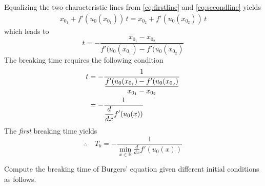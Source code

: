 \documentclass[12pt]{article}
\begin{document}
Equalizing the two characteristic lines from \eqref{eq:firstline} and \eqref{eq:secondline} yields
\begin{align}
	x_{0_{1}} + f'(u_{0}(x_{0_{1}}))\,t = x_{0_{2}} + f'(u_{0}(x_{0_{2}}))\,t  
\end{align}
which leads to
\begin{equation}
	t=-\frac{x_{0_{1}} - x_{0_{2}}}{f'(u_{0}(x_{0_{1}})-f'(u_{0}(x_{0_{2}})}
\end{equation}
The breaking time requires the following condition
\begin{align}
	t & =-\frac{1}{\displaystyle \frac{f'(u_{0}(x_{0_{1}})-f'(u_{0}(x_{0_{2}})}{x_{0_{1}} - x_{0_{2}}}} \notag \\
	  & =-\frac{1}{\displaystyle \frac{d}{dx}f'(u_{0}(x))}
\end{align}
The \emph{first} breaking time yields
\begin{equation}
	\therefore\quad
	\boxed{
		T_{b}=-\frac{1}{\displaystyle \min_{x\in\mathbb{R}} \frac{d}{dx}f'(u_{0}(x))}
	}
\end{equation}
\clearpage
\begin{example}
	Compute the breaking time of Burgers' equation given different initial conditions as follows.
\end{example}
\clearpage
\end{document}

